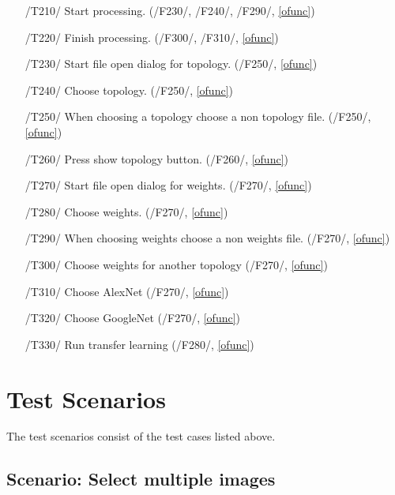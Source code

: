 \documentclass[parskip=full]{scrartcl}
\begin{document}
\begin{itemize}
	\item[/T210/] Start processing. (/F230/, /F240/, /F290/, \ref{ofunc})
	\item[/T220/] Finish processing. (/F300/, /F310/, \ref{ofunc})
	\item[/T230/] Start file open dialog for topology. (/F250/, \ref{ofunc})
	\item[/T240/] Choose topology. (/F250/, \ref{ofunc})
	\item[/T250/] When choosing a topology choose a non topology file. (/F250/, \ref{ofunc})
	\item[/T260/] Press show topology button. (/F260/, \ref{ofunc})
	\item[/T270/] Start file open dialog for weights. (/F270/, \ref{ofunc})
	\item[/T280/] Choose weights. (/F270/, \ref{ofunc})
	\item[/T290/] When choosing weights choose a non weights file. (/F270/, \ref{ofunc})
	\item[/T300/] Choose weights for another topology (/F270/, \ref{ofunc})
	\item[/T310/] Choose AlexNet (/F270/, \ref{ofunc})
	\item[/T320/] Choose GoogleNet (/F270/, \ref{ofunc})
	\item[/T330/] Run transfer learning (/F280/, \ref{ofunc})
\end{itemize}

\pagebreak





\section{Test Scenarios}

The test scenarios consist of the test cases listed above.

\subsection {Scenario: Select multiple images}
\end{document}

